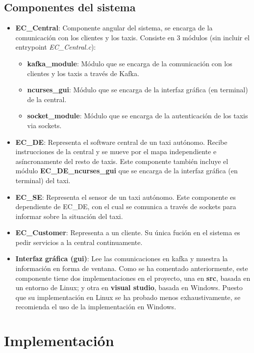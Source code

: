 \documentclass[a4paper,12pt]{article}
\begin{document}
\subsection{Componentes del sistema}
\begin{itemize}
  \item \textbf{EC\_Central}: Componente angular del sistema, se encarga de la comunicación con los clientes y los taxis.
        Consiste en 3 módulos (sin incluir el entrypoint \textit{EC\_Central.c}):
        \begin{itemize}
          \item \textbf{kafka\_module}: Módulo que se encarga de la comunicación con los clientes y los taxis a través de Kafka.
          \item \textbf{ncurses\_gui}: Módulo que se encarga de la interfaz gráfica (en terminal) de la central.
          \item \textbf{socket\_module}: Módulo que se encarga de la autenticación de los taxis via sockets.
        \end{itemize}
  \item \textbf{EC\_DE}: Representa el software central de un taxi autónomo. Recibe instrucciones de la central y se mueve por
        el mapa independiente e asíncronamente del resto de taxis. Este componente también incluye el módulo \textbf{EC\_DE\_ncurses\_gui}
        que se encarga de la interfaz gráfica (en terminal) del taxi.
  \item \textbf{EC\_SE}: Representa el sensor de un taxi autónomo. Este componente es dependiente de EC\_DE, con el cual se comunica
        a través de sockets para informar sobre la situación del taxi.
  \item \textbf{EC\_Customer}: Representa a un cliente. Su única fución en el sistema es pedir servicios a la central continuamente.
  \item \textbf{Interfaz gráfica (gui)}: Lee las comunicaciones en kafka y muestra la información en forma de ventana. Como se ha comentado anteriormente,
        este componente tiene dos implementaciones en el proyecto, una en \textbf{src}, basada en un entorno de Linux; y otra en
        \textbf{visual studio}, basada en Windows. Puesto que su implementación en Linux se ha probado menos exhaustivamente, se
        recomienda el uso de la implementación en Windows.
\end{itemize}

\clearpage
\section{Implementación}
\end{document}

